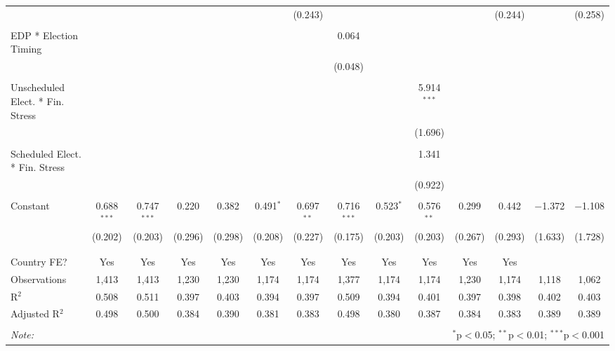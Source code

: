 \begin{table}[!htbp]
\begin{tabular}{@{\extracolsep{5pt}}lccccccccccccc}
  &  &  &  &  &  & (0.243) &  &  &  &  & (0.244) &  & (0.258) \\ 
  & & & & & & & & & & & & & \\ 
 EDP * Election Timing &  &  &  &  &  &  & 0.064 &  &  &  &  &  &  \\ 
  &  &  &  &  &  &  & (0.048) &  &  &  &  &  &  \\ 
  & & & & & & & & & & & & & \\ 
 Unscheduled Elect. * Fin. Stress &  &  &  &  &  &  &  &  & 5.914$^{***}$ &  &  &  &  \\ 
  &  &  &  &  &  &  &  &  & (1.696) &  &  &  &  \\ 
  & & & & & & & & & & & & & \\ 
 Scheduled Elect. * Fin. Stress &  &  &  &  &  &  &  &  & 1.341 &  &  &  &  \\ 
  &  &  &  &  &  &  &  &  & (0.922) &  &  &  &  \\ 
  & & & & & & & & & & & & & \\ 
 Constant & 0.688$^{***}$ & 0.747$^{***}$ & 0.220 & 0.382 & 0.491$^{*}$ & 0.697$^{**}$ & 0.716$^{***}$ & 0.523$^{*}$ & 0.576$^{**}$ & 0.299 & 0.442 & $-$1.372 & $-$1.108 \\ 
  & (0.202) & (0.203) & (0.296) & (0.298) & (0.208) & (0.227) & (0.175) & (0.203) & (0.203) & (0.267) & (0.293) & (1.633) & (1.728) \\ 
  & & & & & & & & & & & & & \\ 
\hline \\[-1.8ex] 
Country FE? & Yes & Yes & Yes & Yes & Yes & Yes & Yes & Yes & Yes & Yes & Yes &  &  \\ 
Observations & 1,413 & 1,413 & 1,230 & 1,230 & 1,174 & 1,174 & 1,377 & 1,174 & 1,174 & 1,230 & 1,174 & 1,118 & 1,062 \\ 
R$^{2}$ & 0.508 & 0.511 & 0.397 & 0.403 & 0.394 & 0.397 & 0.509 & 0.394 & 0.401 & 0.397 & 0.398 & 0.402 & 0.403 \\ 
Adjusted R$^{2}$ & 0.498 & 0.500 & 0.384 & 0.390 & 0.381 & 0.383 & 0.498 & 0.380 & 0.387 & 0.384 & 0.383 & 0.389 & 0.389 \\ 
\hline 
\hline \\[-1.8ex] 
\textit{Note:}  & \multicolumn{13}{r}{$^{*}$p$<$0.05; $^{**}$p$<$0.01; $^{***}$p$<$0.001} \\ 
\end{tabular} 
\end{table} 
